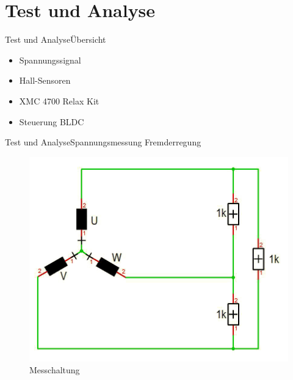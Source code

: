 \section{Test und Analyse}

\begin{frame}{Test und Analyse}{Übersicht}
	\begin{itemize}	
		\item Spannungssignal
		\item Hall-Sensoren
		\item XMC 4700 Relax Kit
		\item Steuerung BLDC
	\end{itemize}
\end{frame}

\begin{frame}{Test und Analyse}{Spannungsmessung Fremderregung}
	\begin{figure}
		\includegraphics[height=\textheight]{Test/Messchaltung_Fremderregung}
		\caption{Messchaltung}
	\end{figure}
\end{frame}

